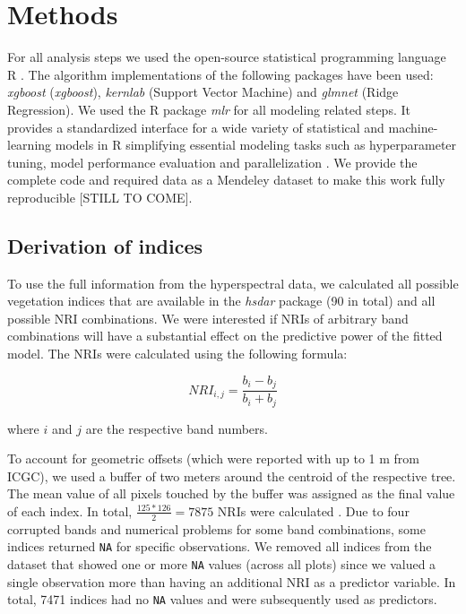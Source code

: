 \documentclass[review]{elsarticle}
\begin{document}
\section{Methods}

\noindent For all analysis steps we used the open-source statistical programming language R \citep{R_core}.
The algorithm implementations of the following packages have been used: \textit{xgboost} \citep{chenXGBoostScalableTree2016} (\textit{xgboost}), \textit{kernlab} \citep{kernlab} (Support Vector Machine) and \textit{glmnet} \citep{glmnet} (Ridge Regression).
We used the R package \textit{mlr} for all modeling related steps.
It provides a standardized interface for a wide variety of statistical and machine-learning models in R simplifying essential modeling tasks such as hyperparameter tuning, model performance evaluation and parallelization \citep{bischlMlrMachineLearning2016}.
We provide the complete code and required data as a Mendeley dataset to make this work fully reproducible [STILL TO COME].

\subsection{Derivation of indices}

\noindent To use the full information from the hyperspectral data, we calculated all possible vegetation indices that are available in the \textit{hsdar} package (90 in total) and all possible \ac{NRI} combinations.
We were interested if NRIs of arbitrary band combinations will have a substantial effect on the predictive power of the fitted model.
The NRIs were calculated using the following formula:

\begin{equation}
	NRI_{i,j} = \frac{b_{i} - b_{j}}{b_{i} + b_{j}}
\end{equation}

\noindent
where $i$ and $j$ are the respective band numbers.

\bigbreak

\noindent To account for geometric offsets (which were reported with up to 1 m from \ac{ICGC}), we used a buffer of two meters around the centroid of the respective tree.
The mean value of all pixels touched by the buffer was assigned as the final value of each index.
In total, $\frac{125*126}{2} = 7875$ NRIs were calculated .
Due to four corrupted bands and numerical problems for some band combinations, some indices returned \texttt{NA} for specific observations.
We removed all indices from the dataset that showed one or more \texttt{NA} values (across all plots) since we valued a single observation more than having an additional NRI as a predictor variable.
In total, 7471 indices had no \texttt{NA} values and were subsequently used as predictors.
\end{document}
